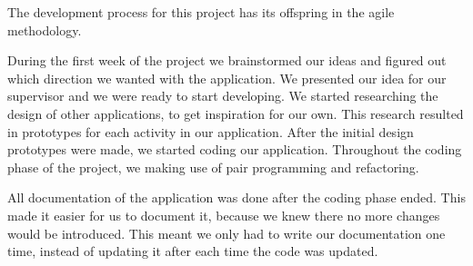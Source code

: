 The development process for this project has its offspring in the agile methodology. 

During the first week of the project we brainstormed our ideas and figured out which direction we wanted with the application. We presented our idea for our supervisor and we were ready to start developing. We started researching the design of other applications, to get inspiration for our own.
This research resulted in prototypes for each activity in our application. After the initial design prototypes were made, we started coding our application.
Throughout the coding phase of the project, we making use of pair programming and refactoring.

All documentation of the application was done after the coding phase ended. This made it easier for us to document it, because we knew there no more changes would be introduced. This meant we only had to write our documentation one time, instead of updating it after each time the code was updated.
